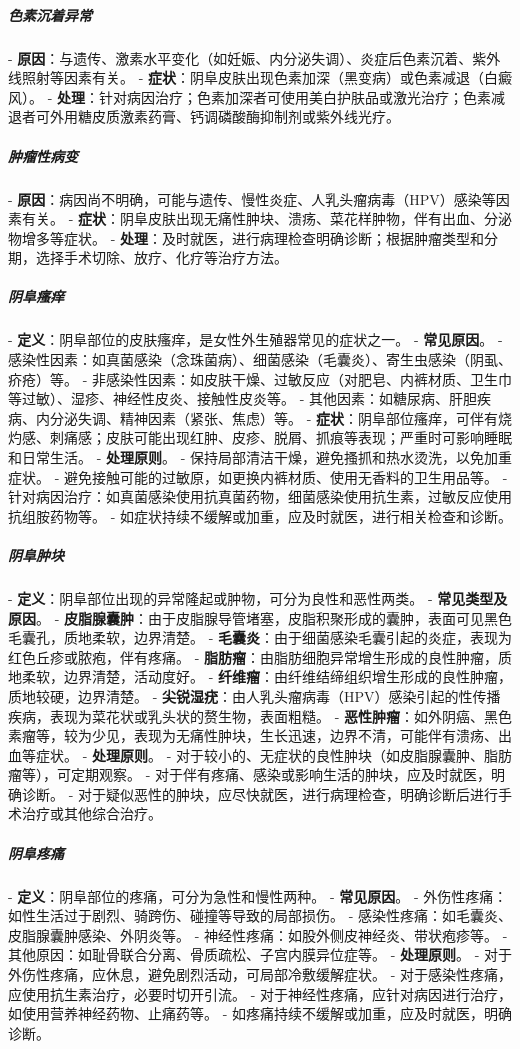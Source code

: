 \begin{enumerate}
\subparagraph{色素沉着异常}
- \textbf{原因}：与遗传、激素水平变化（如妊娠、内分泌失调）、炎症后色素沉着、紫外线照射等因素有关。
- \textbf{症状}：阴阜皮肤出现色素加深（黑变病）或色素减退（白癜风）。
- \textbf{处理}：针对病因治疗；色素加深者可使用美白护肤品或激光治疗；色素减退者可外用糖皮质激素药膏、钙调磷酸酶抑制剂或紫外线光疗。

\subparagraph{肿瘤性病变}
- \textbf{原因}：病因尚不明确，可能与遗传、慢性炎症、人乳头瘤病毒（HPV）感染等因素有关。
- \textbf{症状}：阴阜皮肤出现无痛性肿块、溃疡、菜花样肿物，伴有出血、分泌物增多等症状。
- \textbf{处理}：及时就医，进行病理检查明确诊断；根据肿瘤类型和分期，选择手术切除、放疗、化疗等治疗方法。

\subparagraph{阴阜瘙痒}
- \textbf{定义}：阴阜部位的皮肤瘙痒，是女性外生殖器常见的症状之一。
- \textbf{常见原因}。
  - 感染性因素：如真菌感染（念珠菌病）、细菌感染（毛囊炎）、寄生虫感染（阴虱、疥疮）等。
  - 非感染性因素：如皮肤干燥、过敏反应（对肥皂、内裤材质、卫生巾等过敏）、湿疹、神经性皮炎、接触性皮炎等。
  - 其他因素：如糖尿病、肝胆疾病、内分泌失调、精神因素（紧张、焦虑）等。
- \textbf{症状}：阴阜部位瘙痒，可伴有烧灼感、刺痛感；皮肤可能出现红肿、皮疹、脱屑、抓痕等表现；严重时可影响睡眠和日常生活。
- \textbf{处理原则}。
  - 保持局部清洁干燥，避免搔抓和热水烫洗，以免加重症状。
  - 避免接触可能的过敏原，如更换内裤材质、使用无香料的卫生用品等。
  - 针对病因治疗：如真菌感染使用抗真菌药物，细菌感染使用抗生素，过敏反应使用抗组胺药物等。
  - 如症状持续不缓解或加重，应及时就医，进行相关检查和诊断。

\subparagraph{阴阜肿块}
- \textbf{定义}：阴阜部位出现的异常隆起或肿物，可分为良性和恶性两类。
- \textbf{常见类型及原因}。
  - \textbf{皮脂腺囊肿}：由于皮脂腺导管堵塞，皮脂积聚形成的囊肿，表面可见黑色毛囊孔，质地柔软，边界清楚。
  - \textbf{毛囊炎}：由于细菌感染毛囊引起的炎症，表现为红色丘疹或脓疱，伴有疼痛。
  - \textbf{脂肪瘤}：由脂肪细胞异常增生形成的良性肿瘤，质地柔软，边界清楚，活动度好。
  - \textbf{纤维瘤}：由纤维结缔组织增生形成的良性肿瘤，质地较硬，边界清楚。
  - \textbf{尖锐湿疣}：由人乳头瘤病毒（HPV）感染引起的性传播疾病，表现为菜花状或乳头状的赘生物，表面粗糙。
  - \textbf{恶性肿瘤}：如外阴癌、黑色素瘤等，较为少见，表现为无痛性肿块，生长迅速，边界不清，可能伴有溃疡、出血等症状。
- \textbf{处理原则}。
  - 对于较小的、无症状的良性肿块（如皮脂腺囊肿、脂肪瘤等），可定期观察。
  - 对于伴有疼痛、感染或影响生活的肿块，应及时就医，明确诊断。
  - 对于疑似恶性的肿块，应尽快就医，进行病理检查，明确诊断后进行手术治疗或其他综合治疗。

\subparagraph{阴阜疼痛}
- \textbf{定义}：阴阜部位的疼痛，可分为急性和慢性两种。
- \textbf{常见原因}。
  - 外伤性疼痛：如性生活过于剧烈、骑跨伤、碰撞等导致的局部损伤。
  - 感染性疼痛：如毛囊炎、皮脂腺囊肿感染、外阴炎等。
  - 神经性疼痛：如股外侧皮神经炎、带状疱疹等。
  - 其他原因：如耻骨联合分离、骨质疏松、子宫内膜异位症等。
- \textbf{处理原则}。
  - 对于外伤性疼痛，应休息，避免剧烈活动，可局部冷敷缓解症状。
  - 对于感染性疼痛，应使用抗生素治疗，必要时切开引流。
  - 对于神经性疼痛，应针对病因进行治疗，如使用营养神经药物、止痛药等。
  - 如疼痛持续不缓解或加重，应及时就医，明确诊断。


\end{enumerate}
